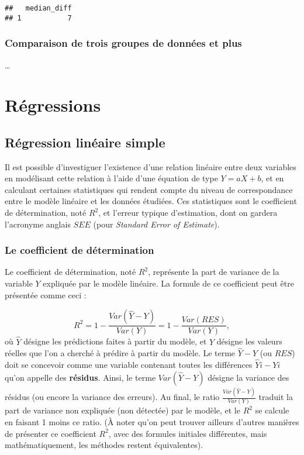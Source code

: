 \documentclass[
  french,
]{book}
\begin{document}
\begin{verbatim}
##   median_diff
## 1           7
\end{verbatim}

\hypertarget{comparaison-de-trois-groupes-de-donnuxe9es-et-plus}{%
\subsection{Comparaison de trois groupes de données et plus}\label{comparaison-de-trois-groupes-de-donnuxe9es-et-plus}}

\ldots{}

\hypertarget{ruxe9gressions}{%
\chapter{Régressions}\label{ruxe9gressions}}

\hypertarget{ruxe9gression-linuxe9aire-simple}{%
\section{Régression linéaire simple}\label{ruxe9gression-linuxe9aire-simple}}

Il est possible d'investiguer l'existence d'une relation linéaire entre deux variables en modélisant cette relation à l'aide d'une équation de type \(Y = aX + b\), et en calculant certaines statistiques qui rendent compte du niveau de correspondance entre le modèle linéaire et les données étudiées. Ces statistiques sont le coefficient de détermination, noté \(R^2\), et l'erreur typique d'estimation, dont on gardera l'acronyme anglais \(SEE\) (pour \emph{Standard Error of Estimate}).

\hypertarget{le-coefficient-de-duxe9termination}{%
\subsection{Le coefficient de détermination}\label{le-coefficient-de-duxe9termination}}

Le coefficient de détermination, noté \(R^2\), représente la part de variance de la variable \(Y\) expliquée par le modèle linéaire. La formule de ce coefficient peut être présentée comme ceci :

\[R^2 = 1 - {\frac {Var(\hat{Y} - Y) } {Var(Y)}} = 1 - {\frac {Var(RES)} {Var(Y)}}, \]
où \(\hat{Y}\) désigne les prédictions faites à partir du modèle, et \(Y\) désigne les valeurs réelles que l'on a cherché à prédire à partir du modèle. Le terme \(\hat{Y} - Y\) (ou \(RES\)) doit se concevoir comme une variable contenant toutes les différences \(\hat{Y}{i} - Y{i}\) qu'on appelle des \textbf{résidus}. Ainsi, le terme \({Var(\hat{Y} - Y) }\) désigne la variance des résidus (ou encore la variance des erreurs). Au final, le ratio \({\frac {Var(\hat{Y} - Y) } {Var(Y)}}\) traduit la part de variance non expliquée (non détectée) par le modèle, et le \(R^2\) se calcule en faisant 1 moins ce ratio. (À noter qu'on peut trouver ailleurs d'autres manières de présenter ce coefficient \(R^2\), avec des formules initiales différentes, mais mathématiquement, les méthodes restent équivalentes).
\end{document}
